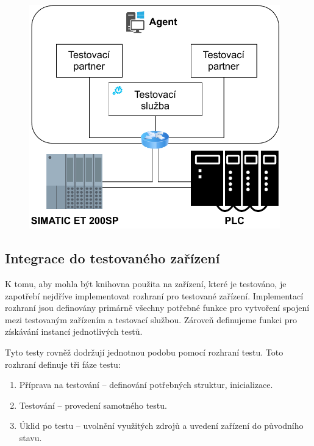 \begin{figure}[htbp]
    \centering 
    \includegraphics[width=0.97\textwidth]{assets/img/bp_assets/devicemodel.pdf}
    \label{fig:bp_devicemodel}
\end{figure}


\subsection{Integrace do testovaného zařízení}

K tomu, aby mohla být knihovna použita na zařízení, které je testováno, je zapotřebí nejdříve implementovat rozhraní pro testované zařízení. Implementací rozhraní jsou definovány primárně všechny potřebné funkce pro vytvoření spojení mezi testovaným zařízením a testovací službou. Zároveň definujeme funkci pro získávání instancí jednotlivých testů. 

Tyto testy rovněž dodržují jednotnou podobu pomocí rozhraní testu. Toto rozhraní definuje tři fáze testu:

\begin{enumerate}
    \item Příprava na testování -- definování potřebných struktur, inicializace.
    \item Testování -- provedení samotného testu.
    \item Úklid po testu -- uvolnění využitých zdrojů a uvedení zařízení do původního stavu.
\end{enumerate}

